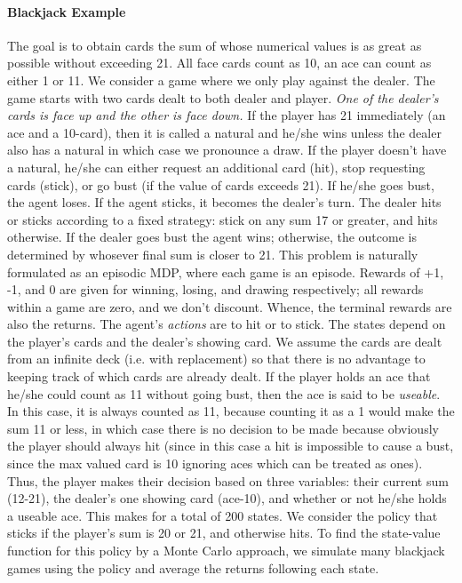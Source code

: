 \documentclass[12pt]{article}
\begin{document}
\paragraph{Blackjack Example} The goal is to obtain cards the sum of whose numerical values is as great as possible without exceeding 21. All face cards count as 10, an ace can count as either 1 or 11. We consider a game where we only play against the dealer. The game starts with two cards dealt to both dealer and player. \emph{One of the dealer's cards is face up and the other is face down.} If the player has 21 immediately (an ace and a 10-card), then it is called a natural and he/she wins unless the dealer also has a natural in which case we pronounce a draw. If the player doesn't have a natural, he/she can either request an additional card (hit), stop requesting cards (stick), or go bust (if the value of cards exceeds 21). If he/she goes bust, the agent loses. If the agent sticks, it becomes the dealer's turn. The dealer hits or sticks according to a fixed strategy: stick on any sum 17 or greater, and hits otherwise. If the dealer goes bust the agent wins; otherwise, the outcome is determined by whosever final sum is closer to 21. This problem is naturally formulated as an episodic MDP, where each game is an episode. Rewards of +1, -1, and 0 are given for winning, losing, and drawing respectively; all rewards within a game are zero, and we don't discount. Whence, the terminal rewards are also the returns. The agent's \emph{actions} are to hit or to stick. The states depend on the player's cards and the dealer's showing card. We assume the cards are dealt from an infinite deck (i.e. with replacement) so that there is no advantage to keeping track of which cards are already dealt. If the player holds an ace that he/she could count as 11 without going bust, then the ace is said to be \emph{useable}. In this case, it is always counted as 11, because counting it as a 1 would make the sum 11 or less, in which case there is no decision to be made because obviously the player should always hit (since in this case a hit is impossible to cause a bust, since the max valued card is 10 ignoring aces which can be treated as ones). Thus, the player makes their decision based on three variables: their current sum (12-21), the dealer's one showing card (ace-10), and whether or not he/she holds a useable ace. This makes for a total of 200 states. We consider the policy that sticks if the player's sum is 20 or 21, and otherwise hits. To find the state-value function for this policy by a Monte Carlo approach, we simulate many blackjack games using the policy and average the returns following each state.
\end{document}
